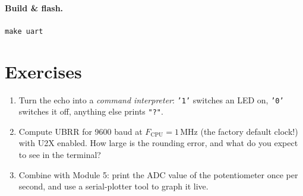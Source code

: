 \documentclass[11pt,a4paper]{article}
\begin{document}
\paragraph{Build \& flash.} \texttt{make uart}



\section{Exercises}

\begin{enumerate}
  \item Turn the echo into a \emph{command interpreter}: \texttt{'1'} switches
        an LED on, \texttt{'0'} switches it off, anything else prints
        \texttt{"?"}.
  \item Compute UBRR for 9600 baud at $F_{\text{CPU}} = 1$\,MHz (the factory
        default clock!) with U2X enabled. How large is the rounding error, and
        what do you expect to see in the terminal?
  \item Combine with Module 5: print the ADC value of the potentiometer once
        per second, and use a serial-plotter tool to graph it live.
\end{enumerate}
\end{document}
